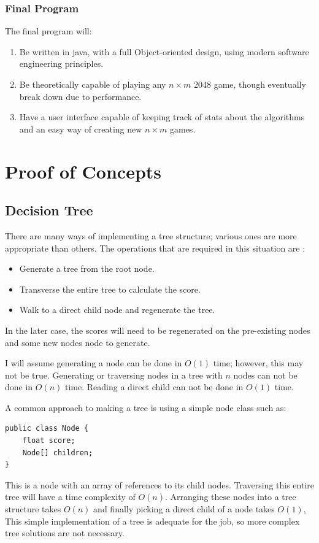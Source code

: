 \documentclass{article}
\begin{document}
\subsubsection{Final Program}
The final program will:
\begin{enumerate}
    \item Be written in java, with a full Object-oriented design, using modern software engineering principles.
    \item Be theoretically capable of playing any $n \times m$ 2048 game, though eventually break down due to performance.
    \item Have a user interface capable of keeping track of stats about the algorithms and an easy way of creating new $n \times m$ games.
\end{enumerate}
\newpage
\section{Proof of Concepts}
\label{sec:proof_of_concepts}
\subsection{Decision Tree}
\label{subsec:dt}
There are many ways of implementing a tree structure; various ones are more appropriate than others. The operations that are required in this situation are \cite{russell2010artificial}:
\begin{itemize}
    \item Generate a tree from the root node.
    \item Transverse the entire tree to calculate the score.
    \item Walk to a direct child node and regenerate the tree.
\end{itemize}
In the later case, the scores  will need to be regenerated on the pre-existing nodes and some new nodes node to generate.

I will assume generating a node can be done in $O(1)$ time; however, this may not be true. Generating or traversing nodes in a tree with $n$ nodes can not be done in $O(n)$ time. Reading a direct child can not be done in $O(1)$ time.

A common approach to making a tree is using a simple node class such as:
\begin{verbatim}
public class Node {
    float score;
    Node[] children;
}
\end{verbatim}
This is a node with an array of references to its child nodes. Traversing this entire tree will have a time complexity of 
$O(n)$. Arranging these nodes into a tree structure takes $O(n)$ and finally picking a direct child of a node takes $O(1)$,
This simple implementation of a tree is adequate for the job, so more complex tree solutions are not necessary.
\end{document}
